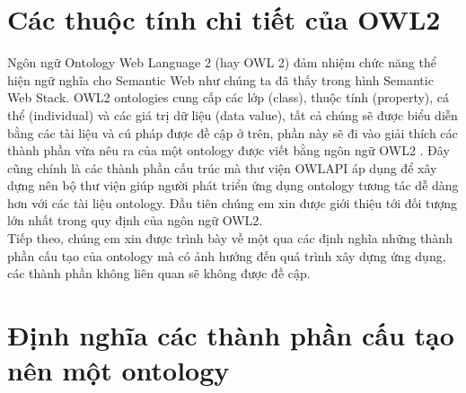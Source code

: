 \section{Các thuộc tính chi tiết của OWL2}
Ngôn ngữ Ontology Web Language 2 (hay OWL 2) đảm nhiệm chức năng thể hiện ngữ nghĩa cho Semantic Web như chúng ta đã thấy trong hình Semantic Web  Stack. OWL2 ontologies cung cấp các lớp (class), thuộc tính (property), cá thể (individual) và các giá trị dữ liệu (data value), tất cả chúng sẽ được biểu diễn bằng các tài liệu và cú pháp được đề cập ở trên, phần này sẽ đi vào giải thích các thành phần vừa nêu ra của một ontology được viết bằng ngôn ngữ OWL2 . Đây cũng chính là các thành phần cấu trúc mà thư viện OWLAPI \cite{owlapi} áp dụng để xây dựng nên bộ thư viện giúp người phát triển ứng dụng ontology tương tác dễ dàng hơn với các tài liệu ontology.
Đầu tiên chúng em xin được giới thiệu tới đối tượng lớn nhất trong quy định của ngôn ngữ OWL2. 
\\
Tiếp theo, chúng em xin được trình bày về một qua các định nghĩa những thành phần cấu tạo của ontology mà có ảnh hướng đến quá trình xây dựng ứng dụng, các thành phần không liên quan sẽ không được đề cập.
\section{Định nghĩa các thành phần cấu tạo nên một ontology}
